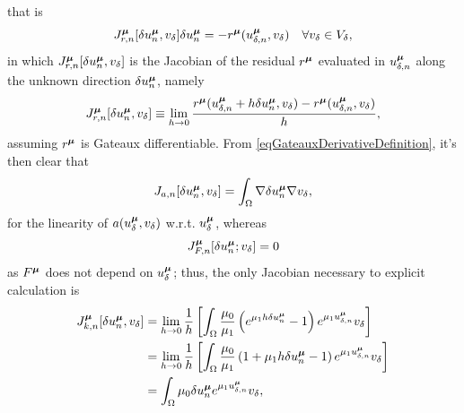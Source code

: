 \documentclass[
    conference,
    nofonttune,
    11pt
]{IEEEtran}
\begin{document}
            that is
            \begin{equation}
                \label{eqDeltauConstraint}
                J^\boldmu_{r,n}[\delta u^\boldmu_n,v_\delta]\delta u^\boldmu_n
                =-r^\boldmu(u^\boldmu_{\delta,n},v_\delta)
                \quad\forall v_\delta\in V_\delta,
            \end{equation}
            in which $J^{\boldsymbol\mu}_{r,n}[\delta u^{\boldsymbol\mu}_n,v_\delta]$ is the Jacobian of the residual $r^{\boldsymbol\mu}$ evaluated in $u^{\boldsymbol\mu}_{\delta,n}$ along the unknown direction $\delta u^{\boldsymbol\mu}_n$, namely
            \begin{equation}
                \label{eqGateauxDerivativeDefinition}
                J^\boldmu_{r,n}[\delta u^\boldmu_n,v_\delta]\equiv\lim_{h\rightarrow0}
                \frac{r^\boldmu(u^\boldmu_{\delta,n}+h\delta u^\boldmu_n,v_\delta)
                -r^\boldmu(u^\boldmu_{\delta,n},v_\delta)}h,
            \end{equation}
            assuming $r^{\boldsymbol\mu}$ is Gateaux differentiable. From \eqref{eqGateauxDerivativeDefinition}, it's then clear that
            $$
                J_{a,n}[\delta u^{\boldsymbol\mu}_n,v_\delta]
                =\int_\Omega\nabla\delta u^{\boldsymbol\mu}_n\nabla v_\delta,
            $$
            for the linearity of $a(u^{\boldsymbol\mu}_\delta,v_\delta)$ w.r.t. $u^{\boldsymbol\mu}_\delta$, whereas
            $$
                J^{\boldsymbol\mu}_{F,n}[\delta u^{\boldsymbol\mu}_n;v_\delta]=0
            $$
            as $F^{\boldsymbol\mu}$ does not depend on $u^{\boldsymbol\mu}_\delta$; thus, the only Jacobian necessary to explicit calculation is
            \begin{equation*}
                \begin{aligned}
                    J^{\boldsymbol\mu}_{k,n}[\delta u^{\boldsymbol\mu}_n,v_\delta]
                    &=\lim_{h\rightarrow0}{\frac1h\left[\int_\Omega\frac{\mu_0}{\mu_1}
                    \left(e^{\mu_1h\delta u^{\boldsymbol\mu}_n}-1\right)e^{\mu_1u^{\boldsymbol\mu}_{\delta,n}}v_\delta\right]}
                    \\&=\lim_{h\rightarrow0}{\frac1h\left[\int_\Omega\frac{\mu_0}{\mu_1}
                    \left(1+\mu_1h\delta u^{\boldsymbol\mu}_n-1\right)e^{\mu_1u^{\boldsymbol\mu}_{\delta,n}}v_\delta\right]}
                    \\&=\int_\Omega\mu_0\delta u^{\boldsymbol\mu}_ne^{\mu_1u^{\boldsymbol\mu}_{\delta,n}}v_\delta,
                \end{aligned}
            \end{equation*}
\end{document}
